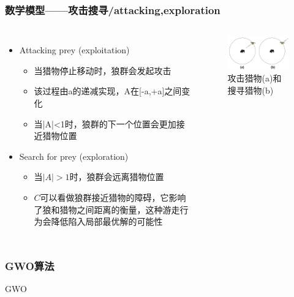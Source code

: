 \begin{frame}
	\frametitle{数学模型——攻击搜寻/attacking,exploration}
	\begin{columns}
		\begin{itemize}
			\item {Attacking prey (exploitation)}
				\begin{itemize}
					\item {当猎物停止移动时，狼群会发起攻击}
					\item {该过程由a的递减实现，A在[-a,+a]之间变化}
					\item {当|A|<1时，狼群的下一个位置会更加接近猎物位置}
				\end{itemize}
			\item {Search for prey (exploration)}
				\begin{itemize}
					\item {当$|A|>1$时，狼群会远离猎物位置}
					\item {$C$可以看做狼群接近猎物的障碍，它影响了狼和猎物之间距离的衡量，这种游走行为会降低陷入局部最优解的可能性}
				\end{itemize}
		\end{itemize}
		\begin{figure}[htbp]
			\centering
			\includegraphics[width=7cm]{pic/wolf5.png}
			\caption{攻击猎物(a)和搜寻猎物(b)}
		\end{figure}
	\end{columns}
\end{frame}


\begin{frame}
	\frametitle{GWO算法}
	\begin{algorithm}[H]
	\caption{GWO}\label{wolf_alg}
	 \scriptsize
		\begin{algorithmic}
				\ENDFOR
			\ENDWHILE
		\end{algorithmic}
	\end{algorithm}
\end{frame}


